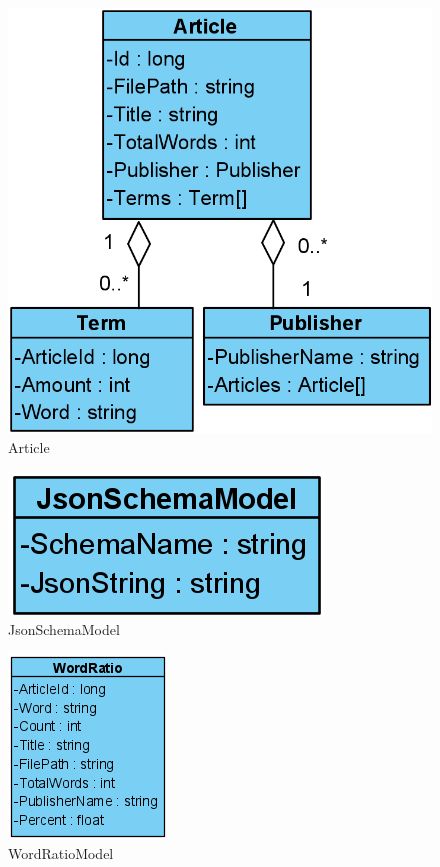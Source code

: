 \begin{figure}[H]
    \centering
    \includegraphics[scale=0.25]{Images/ArticleModel.PNG}
    \caption{Article}
    \label{Article}
\end{figure}


\begin{figure}[H]
    \centering
    \includegraphics[scale=0.25]{Images/JsonSchemaModel.png}
    \caption{JsonSchemaModel}
    \label{JsonSchemaModel}
\end{figure}


\begin{figure}[H]
    \centering
    \includegraphics[scale=0.25]{Images/WordRatioModel.png}
    \caption{WordRatioModel}
    \label{WordRatioModel}
\end{figure}